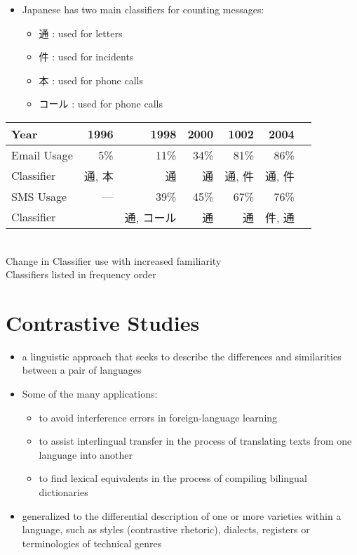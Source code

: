 \documentclass[a4paper,landscape,headrule,footrule,xetex]{foils}
\begin{document}
 \makexeCJKactive
\begin{itemize}
\item Japanese has two main classifiers for counting messages:
 
  \begin{itemize}
  \item 通 : used for letters
  \item 件 : used for incidents
  \item 本 : used for phone calls
  \item コール : used for phone calls
  \end{itemize}
\end{itemize}
\begin{center}
  \begin{tabular}{lrrrrrr}
    Year &  1996 & 1998 & 2000 & 1002 & 2004 \\ \hline
    Email Usage & 5\% & 11\% & 34\% & 81\% & 86\%\\
    Classifier  & 通, 本  & 通  & 通 & 通, 件 & 通, 件 \\
    SMS  Usage &   ---  & 39\% & 45\% & 67\% & 76\%\\
    Classifier  &  &  通, コール  & 通  & 通 & 件, 通 \\
  \end{tabular}
  \\[2ex] Change in Classifier use with increased familiarity
  \\ Classifiers listed in frequency order
\end{center}
\makexeCJKinactive


\section{Contrastive Studies}
\MyLogo{}


\begin{itemize}
\item  a linguistic approach that seeks to describe the differences and similarities between a pair of languages
\item Some of the many applications:
  \begin{itemize}
  \item to avoid interference errors in foreign-language learning
  \item to assist interlingual transfer in the process of translating texts from one language into another
  \item to find lexical equivalents in the process of compiling bilingual dictionaries
  \end{itemize}
\item generalized to the differential description of one or more varieties within a language, such as styles (contrastive rhetoric), dialects, registers or terminologies of technical genres
\end{itemize}
\end{document}
